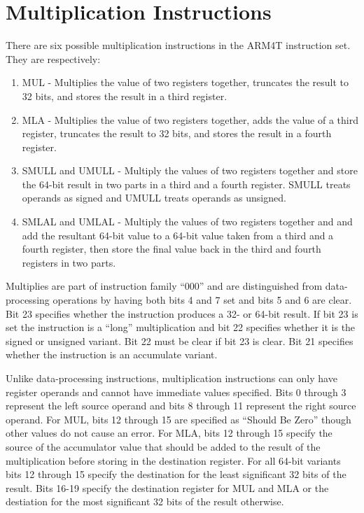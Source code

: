 \section{Multiplication Instructions}

There are six possible multiplication instructions in the ARM4T instruction set. They are respectively:

\begin{enumerate}
  \item MUL - Multiplies the value of two registers together, truncates the result to 32 bits, and stores the result in a third register.\citep[Section A3.5.1, pp. A3-10]{armarm:2005}
    \item MLA - Multiplies the value of two registers together, adds the value of a third register, truncates the result to 32 bits, and stores the result in a fourth register.\citep[Section A3.5.1, pp. A3-10]{armarm:2005}
    \item SMULL and UMULL - Multiply the values of two registers together and store the 64-bit result in two parts in a third and a fourth register. SMULL treats operands as signed and UMULL treats operands as unsigned.\citep[Section A3.5.2, pp. A3-10]{armarm:2005}
    \item SMLAL and UMLAL - Multiply the values of two registers together and and add the resultant 64-bit value to a 64-bit value taken from a third and a fourth register, then store the final value back in the third and fourth registers in two parts.\citep[Section A3.5.2, pp. A3-10]{armarm:2005}
\end{enumerate}

Multiplies are part of instruction family ``000'' and are distinguished from data-processing operations by having both bits 4 and 7 set and bits 5 and 6 are clear. Bit 23 specifies whether the instruction produces a 32- or 64-bit result. If bit 23 is set the instruction is a ``long'' multiplication and bit 22 specifies whether it is the signed or unsigned variant. Bit 22 must be clear if bit 23 is clear. Bit 21 specifies whether the instruction is an accumulate variant.

Unlike data-processing instructions, multiplication instructions can only have register operands and cannot have immediate values specified. Bits 0 through 3 represent the left source operand and bits 8 through 11 represent the right source operand. For MUL, bits 12 through 15 are specified as ``Should Be Zero'' though other values do not cause an error. For MLA, bits 12 through 15 specify the source of the accumulator value that should be added to the result of the multiplication before storing in the destination register. For all 64-bit variants bits 12 through 15 specify the destination for the least significant 32 bits of the result. Bits 16-19 specify the destination register for MUL and MLA or the destiation for the most significant 32 bits of the result otherwise.

